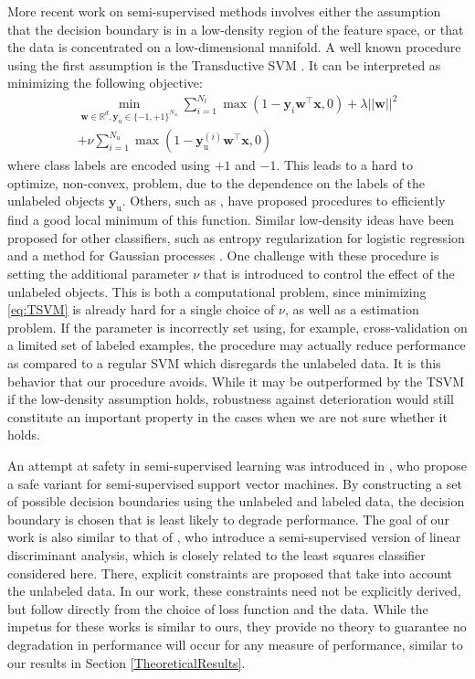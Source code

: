 \documentclass{article}
\renewcommand{\vec}[1]{\mathbf{#1}}
\begin{document}
More recent work on semi-supervised methods involves either the assumption that the decision boundary is in a low-density region of the feature space, or that the data is concentrated on a low-dimensional manifold. A well known procedure using the first assumption is the Transductive SVM \citep{Joachims1999}. It can be interpreted as minimizing the following objective:
\begin{multline}
\label{eq:TSVM}
\min_{\vec{w} \in \mathbb{R}^d,\vec{y}_\text{u} \in \{-1,+1\}^{N_u}} \sum_{i=1}^{N_l} \max(1-\vec{y}_i \vec{w}^\top \vec{x},0) + \lambda ||\vec{w}||^2 \\ + \nu \sum_{i=1}^{N_u} \max(1-\vec{y}_\text{u}^{(i)} \vec{w}^\top \vec{x},0)
\end{multline}
where class labels are encoded using $+1$ and $-1$. This leads to a hard to optimize, non-convex, problem, due to the dependence on the labels of the unlabeled objects $\vec{y}_\text{u}$. Others, such as \citep{Sindhwani2006}, have proposed procedures to efficiently find a good local minimum of this function. Similar low-density ideas have been proposed for other classifiers, such as entropy regularization for logistic regression \citep{Grandvalet2005} and a method for Gaussian processes \citep{Lawrence2004}. One challenge with these procedure is setting the additional parameter $\nu$ that is introduced to control the effect of the unlabeled objects. This is both a computational problem, since minimizing \eqref{eq:TSVM} is already hard for a single choice of $\nu$, as well as a estimation problem. If the parameter is incorrectly set using, for example, cross-validation on a limited set of labeled examples, the procedure may actually reduce performance as compared to a regular SVM which disregards the unlabeled data. It is this behavior that our procedure avoids. While it may be outperformed by the TSVM if the low-density assumption holds, robustness against deterioration would still constitute an important property in the cases when we are not sure whether it holds.

An attempt at safety in semi-supervised learning was introduced in \citep{Li2011}, who propose a safe variant for semi-supervised support vector machines. By constructing a set of possible decision boundaries using the unlabeled and labeled data, the decision boundary is chosen that is least likely to degrade performance. The goal of our work is also similar to that of \citep{Loog2010,Loog2014a}, who introduce a semi-supervised version of linear discriminant analysis, which is closely related to the least squares classifier considered here. There, explicit constraints are proposed that take into account the unlabeled data. In our work, these constraints need not be explicitly derived, but follow  directly from the choice of loss function and the data. While the impetus for these works is similar to ours, they provide no theory to guarantee no degradation in performance will occur for any measure of performance, similar to our results in Section \ref{TheoreticalResults}.
\end{document}
